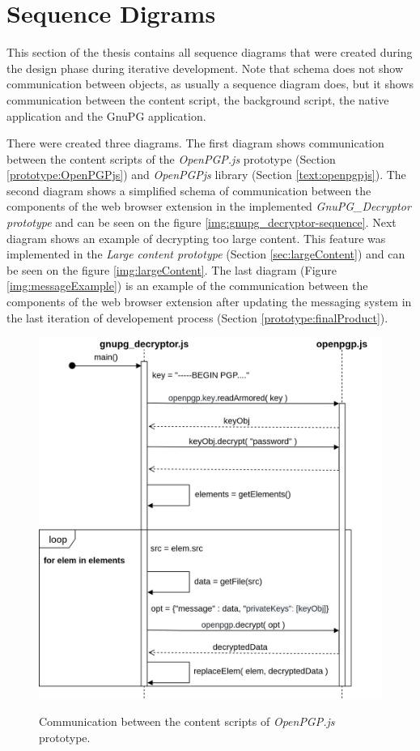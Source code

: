 \chapter{Sequence Digrams}
This section of the thesis contains all sequence diagrams that were created during the design phase during iterative development. Note that schema does not show communication between objects, as usually a sequence diagram does, but it shows communication between the content script, the background script, the native application and the GnuPG application.

There were created three diagrams. The first diagram shows communication between the content scripts of the \textit{OpenPGP.js} prototype (Section \ref{prototype:OpenPGPjs}) and \textit{OpenPGPjs} library (Section \ref{text:openpgpjs}). The second diagram shows a simplified schema of communication between the components of the web browser extension in the implemented \textit{GnuPG\_Decryptor prototype} and can be seen on the figure \ref{img:gnupg_decryptor-sequence}. Next diagram shows an example of decrypting too large content. This feature was implemented in the \textit{Large content prototype} (Section \ref{sec:largeContent}) and can be seen on the figure \ref{img:largeContent}. The last diagram (Figure \ref{img:messageExample}) is an example of the communication between the components of the web browser extension after updating the messaging system in the last iteration of developement process (Section \ref{prototype:finalProduct}).

\begin{figure}[H]
    \begin{center}
        \label{img:openpgp-sequence}
        \includegraphics[width=1.3\textwidth,angle=90]{obrazky-figures/openpgp-sequence.png}
        \caption{Communication between the content scripts of \textit{OpenPGP.js} prototype.}
    \end{center}
\end{figure}


